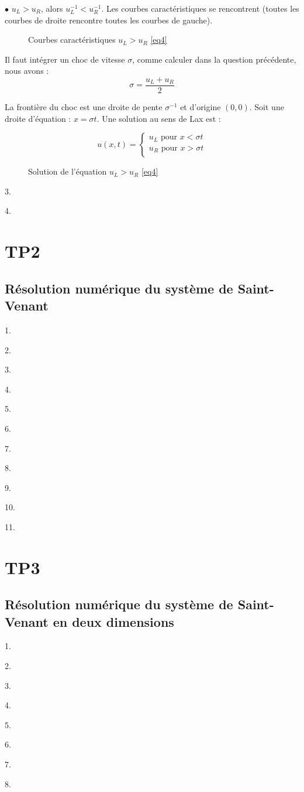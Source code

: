 \documentclass{article}
\begin{document}
$\bullet$ $u_L > u_R$, alors $u_L^{-1} < u_R^{-1}$. Les courbes caractéristiques se rencontrent (toutes les courbes de droite rencontre toutes les courbes de gauche).

\begin{figure}
  
  \caption{Courbes caractéristiques $u_L > u_R$ \ref{eq4}}
\end{figure}

Il faut intégrer un choc de vitesse $\sigma$, comme calculer dans la question précédente, nous avons :
\[ \sigma = \frac{u_L+u_R}{2} \]

La frontière du choc est une droite de pente $\sigma^{-1}$ et d'origine $(0,0)$. Soit une droite d'équation : $x = \sigma t$. Une solution au sens de Lax est :

\[ u(x,t) = \left\{ \begin{matrix}
				u_L \text{ pour } x < \sigma t \\
				u_R \text{ pour } x > \sigma t \\
\end{matrix}\right.
\tag{Sol4.2} \]

\begin{figure}
  
  \caption{Solution de l'équation $u_L > u_R$ \ref{eq4}}
\end{figure}

3.

4.

\section{TP2}

\subsection{Résolution numérique du système de Saint-Venant}

1.

2.

3.

4.

5.

6.

7.

8.

9.

10.

11.

\section{TP3}

\subsection{Résolution numérique du système de Saint-Venant en deux dimensions}

1.

2.

3.

4.

5.

6.

7.

8.
\end{document}

